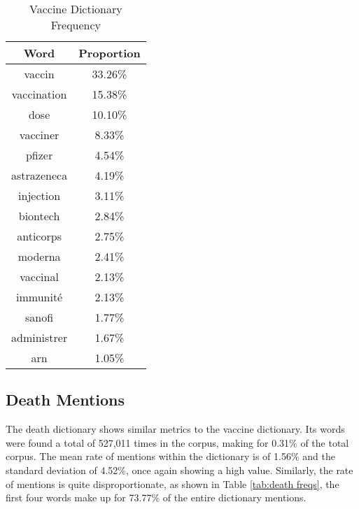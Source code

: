 \begin{table}[H]
\caption{Vaccine Dictionary Frequency}
\label{tab:vaccine freqs}
\centering
\begin{tabular}{@{}cc@{}}
\toprule
Word      & Proportion \\ \midrule
vaccin      & 33.26\% \\
vaccination & 15.38\% \\
dose        & 10.10\% \\
vacciner    & 8.33\%  \\
pfizer      & 4.54\%  \\
astrazeneca & 4.19\%  \\
injection   & 3.11\%  \\
biontech    & 2.84\%  \\
anticorps   & 2.75\%  \\
moderna     & 2.41\%  \\
vaccinal    & 2.13\%  \\
immunité    & 2.13\%  \\
sanofi      & 1.77\%  \\
administrer & 1.67\%  \\
arn         & 1.05\%  \\ \bottomrule
\end{tabular}
\end{table}

\subsection{Death Mentions}

The death dictionary shows similar metrics to the vaccine dictionary. Its words were found a total of 527,011 times in the corpus, making for 0.31\% of the total corpus. The mean rate of mentions within the dictionary is of 1.56\% and the standard deviation of 4.52\%, once again showing a high value. Similarly, the rate of mentions is quite disproportionate, as shown in Table \ref{tab:death freqs}, the first four words make up for 73.77\% of the entire dictionary mentions.

